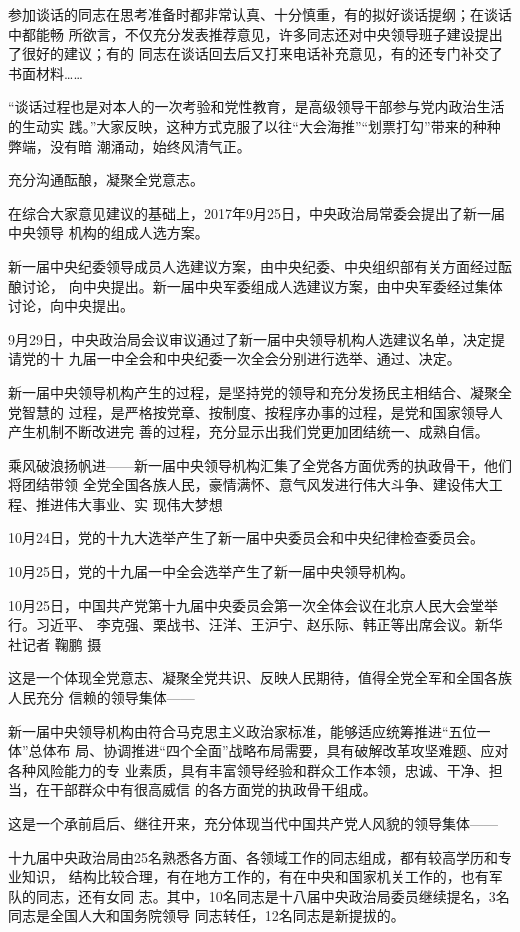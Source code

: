 \documentclass[11pt]{ctexart}
\begin{document}
{{{{参加谈话的同志在思考准备时都非常认真、十分慎重，有的拟好谈话提纲；在谈话中都能畅
所欲言，不仅充分发表推荐意见，许多同志还对中央领导班子建设提出了很好的建议；有的
同志在谈话回去后又打来电话补充意见，有的还专门补交了书面材料……

“谈话过程也是对本人的一次考验和党性教育，是高级领导干部参与党内政治生活的生动实
践。”大家反映，这种方式克服了以往“大会海推”“划票打勾”带来的种种弊端，没有暗
潮涌动，始终风清气正。

充分沟通酝酿，凝聚全党意志。

在综合大家意见建议的基础上，2017年9月25日，中央政治局常委会提出了新一届中央领导
机构的组成人选方案。

新一届中央纪委领导成员人选建议方案，由中央纪委、中央组织部有关方面经过酝酿讨论，
向中央提出。新一届中央军委组成人选建议方案，由中央军委经过集体讨论，向中央提出。

9月29日，中央政治局会议审议通过了新一届中央领导机构人选建议名单，决定提请党的十
九届一中全会和中央纪委一次全会分别进行选举、通过、决定。

新一届中央领导机构产生的过程，是坚持党的领导和充分发扬民主相结合、凝聚全党智慧的
过程，是严格按党章、按制度、按程序办事的过程，是党和国家领导人产生机制不断改进完
善的过程，充分显示出我们党更加团结统一、成熟自信。

乘风破浪扬帆进——新一届中央领导机构汇集了全党各方面优秀的执政骨干，他们将团结带领
全党全国各族人民，豪情满怀、意气风发进行伟大斗争、建设伟大工程、推进伟大事业、实
现伟大梦想

10月24日，党的十九大选举产生了新一届中央委员会和中央纪律检查委员会。

10月25日，党的十九届一中全会选举产生了新一届中央领导机构。


10月25日，中国共产党第十九届中央委员会第一次全体会议在北京人民大会堂举行。习近平、
李克强、栗战书、汪洋、王沪宁、赵乐际、韩正等出席会议。新华社记者 鞠鹏 摄

这是一个体现全党意志、凝聚全党共识、反映人民期待，值得全党全军和全国各族人民充分
信赖的领导集体——

新一届中央领导机构由符合马克思主义政治家标准，能够适应统筹推进“五位一体”总体布
局、协调推进“四个全面”战略布局需要，具有破解改革攻坚难题、应对各种风险能力的专
业素质，具有丰富领导经验和群众工作本领，忠诚、干净、担当，在干部群众中有很高威信
的各方面党的执政骨干组成。

这是一个承前启后、继往开来，充分体现当代中国共产党人风貌的领导集体——

十九届中央政治局由25名熟悉各方面、各领域工作的同志组成，都有较高学历和专业知识，
结构比较合理，有在地方工作的，有在中央和国家机关工作的，也有军队的同志，还有女同
志。其中，10名同志是十八届中央政治局委员继续提名，3名同志是全国人大和国务院领导
同志转任，12名同志是新提拔的。

}}}}
\end{document}
